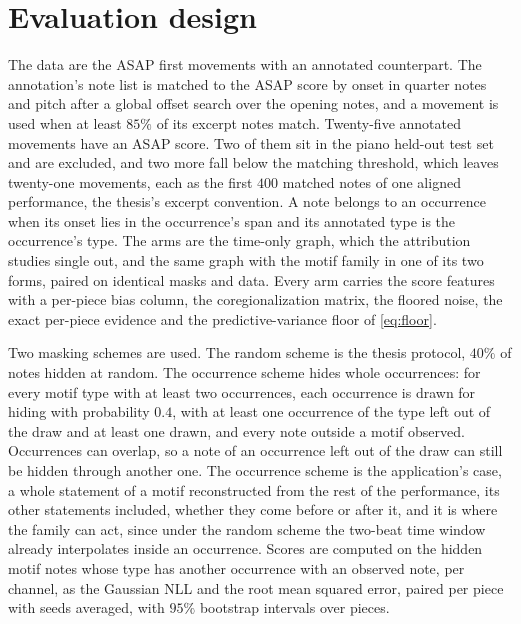 \documentclass[11pt,a4paper]{report}
\begin{document}
\section{Evaluation design}\label{sec:motif-design}
The data are the ASAP first movements with an annotated counterpart. The
annotation's note list is matched to the ASAP score by onset in quarter
notes and pitch after a global offset search over the opening notes, and a movement
is used when at least $85\%$ of its excerpt notes match. Twenty-five
annotated movements have an ASAP score. Two of them sit in the piano
held-out test set and are excluded, and two more fall below the matching
threshold, which leaves twenty-one movements, each as the first $400$
matched notes of one aligned performance, the thesis's excerpt convention.
A note belongs to an occurrence when its onset lies in the occurrence's
span and its annotated type is the occurrence's type. The arms are the
time-only graph, which the attribution studies single out, and the
same graph with the motif family in one of its two forms, paired on
identical masks and data. Every arm carries the score features with a
per-piece bias column, the coregionalization matrix, the floored noise, the
exact per-piece evidence and the predictive-variance floor of
\eqref{eq:floor}.

Two masking schemes are used. The random scheme is the thesis protocol,
$40\%$ of notes hidden at random. The occurrence scheme hides whole
occurrences: for every motif type with at least two occurrences, each
occurrence is drawn for hiding with probability $0.4$, with at least one
occurrence of the type left out of the draw and at least one drawn, and
every note outside a motif observed. Occurrences can overlap, so a note of
an occurrence left out of the draw can still be hidden through another
one. The occurrence scheme is the application's case, a whole
statement of a motif reconstructed from the rest of the performance, its
other statements included, whether they come before or after it, and it is
where the family can act, since under the random scheme the two-beat time window
already interpolates inside an occurrence. Scores are computed on the hidden
motif notes whose type has another occurrence with an observed note, per
channel, as the Gaussian NLL and the root mean squared error, paired
per piece with seeds averaged, with $95\%$ bootstrap intervals over pieces.
\end{document}
